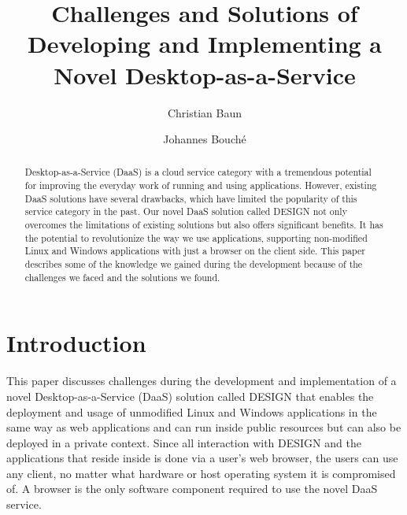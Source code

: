 \documentclass[runningheads]{llncs}
\begin{document}
%
\title{Challenges and Solutions of Developing and
	Implementing a Novel Desktop-as-a-Service}
%
%
\author{Christian Baun \and
	Johannes Bouché}
%
%
%
\maketitle              %
%
\begin{abstract}
Desktop-as-a-Service (DaaS) is a cloud service category with a tremendous potential for improving the everyday work of running and using applications. However, existing DaaS solutions have several drawbacks, which have limited the popularity of this service category in the past. Our novel DaaS solution called DESIGN not only overcomes the limitations of existing solutions but also offers significant benefits. It has the potential to revolutionize the way we use applications, supporting non-modified Linux and Windows applications with just a browser on the client side. This paper describes some of the knowledge we gained during the development because of the challenges we faced and the solutions we found.

\end{abstract}
%
%
%
\section{Introduction}


This paper discusses challenges during the development and implementation of a novel Desktop-as-a-Service (DaaS) solution called DESIGN that enables the deployment and usage of unmodified Linux and Windows applications in the same way as web applications and can run inside public resources but can also be deployed in a private context. Since all interaction with DESIGN and the applications that reside inside is done via a user's web browser, the users can use any client, no matter what hardware or host operating system it is compromised of. A browser is the only software component required to use the novel DaaS service.
\end{document}
